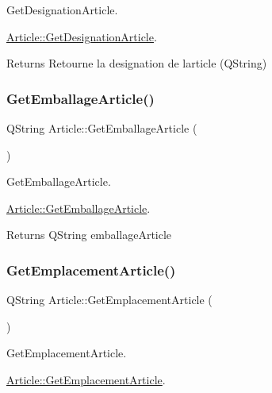Get\+Designation\+Article. 

\mbox{\hyperlink{class_article_af9b0da3a793b4a0dcfe8e97b24ac4f79}{Article\+::\+Get\+Designation\+Article}}.

\begin{DoxyReturn}{Returns}
Retourne la designation de l\textquotesingle{}article (Q\+String)


\end{DoxyReturn}
\mbox{\label{class_article_aa086c1a1aa8af81fb34c9a20b05d0155}} 
\subsubsection{\texorpdfstring{Get\+Emballage\+Article()}{GetEmballageArticle()}}
{\footnotesize\ttfamily Q\+String Article\+::\+Get\+Emballage\+Article (\begin{DoxyParamCaption}{ }\end{DoxyParamCaption})}



Get\+Emballage\+Article. 

\mbox{\hyperlink{class_article_aa086c1a1aa8af81fb34c9a20b05d0155}{Article\+::\+Get\+Emballage\+Article}}.

\begin{DoxyReturn}{Returns}
Q\+String emballage\+Article


\end{DoxyReturn}
\mbox{\label{class_article_aca48728ecc7862026b40b18db12591fa}} 
\subsubsection{\texorpdfstring{Get\+Emplacement\+Article()}{GetEmplacementArticle()}}
{\footnotesize\ttfamily Q\+String Article\+::\+Get\+Emplacement\+Article (\begin{DoxyParamCaption}{ }\end{DoxyParamCaption})}



Get\+Emplacement\+Article. 

\mbox{\hyperlink{class_article_aca48728ecc7862026b40b18db12591fa}{Article\+::\+Get\+Emplacement\+Article}}.

